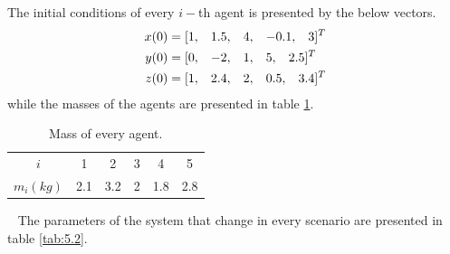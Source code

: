     The initial conditions of every $i-$th agent is presented by the below vectors.
    \begin{equation*}
        \begin{align}
            x(0) &= [1, \hspace{3.0mm} 1.5, \hspace{3.0mm} 4, \hspace{3.0mm} -0.1, \hspace{3.0mm} 3]^T\\
            y(0) &= [0, \hspace{3.0mm} -2, \hspace{3.0mm} 1, \hspace{3.0mm} 5, \hspace{3.0mm} 2.5]^T\\
            z(0) &= [1, \hspace{3.0mm} 2.4, \hspace{3.0mm} 2, \hspace{3.0mm} 0.5, \hspace{3.0mm} 3.4]^T
        \end{align}
    \end{equation*}
    while the masses of the agents are presented in table \ref{tab:5.1}.
    \begin{table}[h]
        \centering
        \begin{tabular}{c c c c c c}
        \hline
            $i$ &  1 & 2 & 3 & 4 & 5\\
            $m_i (kg)$ & 2.1 & 3.2 & 2 & 1.8 & 2.8\\
        \hline
        \end{tabular}
        \caption{Mass of every agent.}
        \label{tab:5.1}
    \end{table}
    ~\newpage
    The parameters of the system that change in every scenario are presented in table \ref{tab:5.2}.
